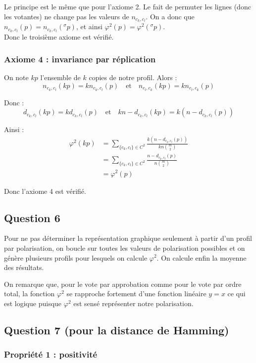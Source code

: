 \documentclass[11pt]{article}
\begin{document}
Le principe est le même que pour l'axiome 2. Le fait de permuter les lignes (donc les votantes) ne change pas les valeurs de $n_{c_k,c_l}$. On a donc que $n_{c_k,c_l}(p) = n_{c_k,c_l}({}^\sigma p)$, et ainsi $\varphi^2(p) = \varphi^2({}^\sigma p)$.\\

Donc le troisième axiome est vérifié.


\subsubsection{Axiome 4 : invariance par réplication}

On note $kp$ l'ensemble de $k$ copies de notre profil. Alors :
\[
n_{c_k,c_l}(kp) = k n_{c_k,c_l}(p)
\quad \text{et} \quad
n_{c_l,c_k}(kp) = k n_{c_l,c_k}(p)
\]

Donc :
\[
d_{c_k,c_l}(kp) = k d_{c_k,c_l}(p)
\quad \text{et} \quad
kn - d_{c_k,c_l}(kp) = k(n - d_{c_k,c_l}(p))
\]

Ainsi :
\begin{align*}
\varphi^2(kp) 
&= \sum_{\{c_k,c_l\} \in C^2}
\frac{k(n - d_{c_k,c_l}(p))}{kn \binom{m}{2}} \\
&= \sum_{\{c_k,c_l\} \in C^2}
\frac{n - d_{c_k,c_l}(p)}{n \binom{m}{2}} \\
&= \varphi^2(p)
\end{align*}

Donc l’axiome 4 est vérifié.

\subsection{Question 6}

Pour ne pas déterminer la représentation graphique seulement à partir d'un profil par polarisation, on boucle sur toutes les valeurs de polarisation possibles et on génère plusieurs profils pour lesquels on calcule $\varphi^2$. On calcule enfin la moyenne des résultats. 

On remarque que, pour le vote par approbation comme pour le vote par ordre total, la fonction $\varphi^2$ se rapproche fortement d'une fonction linéaire $y=x$ ce qui est logique puisque $\varphi^2$ est sensé représenter notre polarisation. 

\subsection{Question 7 (pour la distance de Hamming)}

\subsubsection{Propriété 1 : positivité}
\end{document}
